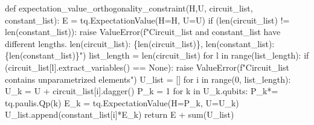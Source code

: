 \documentclass[
  letterpaper,
  DIV=11,
  numbers=noendperiod]{scrartcl}
\newenvironment{Shaded}{\begin{snugshade}}{\end{snugshade}}
\newcommand{\BuiltInTok}[1]{\textcolor[rgb]{0.00,0.23,0.31}{#1}}
\newcommand{\ControlFlowTok}[1]{\textcolor[rgb]{0.00,0.23,0.31}{#1}}
\newcommand{\DecValTok}[1]{\textcolor[rgb]{0.68,0.00,0.00}{#1}}
\newcommand{\KeywordTok}[1]{\textcolor[rgb]{0.00,0.23,0.31}{#1}}
\newcommand{\NormalTok}[1]{\textcolor[rgb]{0.00,0.23,0.31}{#1}}
\newcommand{\OperatorTok}[1]{\textcolor[rgb]{0.37,0.37,0.37}{#1}}
\newcommand{\PreprocessorTok}[1]{\textcolor[rgb]{0.68,0.00,0.00}{#1}}
\newcommand{\SpecialCharTok}[1]{\textcolor[rgb]{0.37,0.37,0.37}{#1}}
\newcommand{\SpecialStringTok}[1]{\textcolor[rgb]{0.13,0.47,0.30}{#1}}
\newcommand{\VariableTok}[1]{\textcolor[rgb]{0.07,0.07,0.07}{#1}}
\begin{document}
\begin{Shaded}
\begin{Highlighting}[]
    \KeywordTok{def}\NormalTok{ expectation\_value\_orthogonality\_constraint(H,U, circuit\_list, constant\_list):}
\NormalTok{        E }\OperatorTok{=}\NormalTok{ tq.ExpectationValue(H}\OperatorTok{=}\NormalTok{H, U}\OperatorTok{=}\NormalTok{U)}
        \ControlFlowTok{if}\NormalTok{ (}\BuiltInTok{len}\NormalTok{(circuit\_list) }\OperatorTok{!=} \BuiltInTok{len}\NormalTok{(constant\_list)):}
            \ControlFlowTok{raise} \PreprocessorTok{ValueError}\NormalTok{(}\SpecialStringTok{f"Circuit\_list and constant\_list have different lengths. len(circuit\_list): \textquotesingle{}}\SpecialCharTok{\{}\BuiltInTok{len}\NormalTok{(circuit\_list)}\SpecialCharTok{\}}\SpecialStringTok{\textquotesingle{}, len(constant\_list): \textquotesingle{}}\SpecialCharTok{\{}\BuiltInTok{len}\NormalTok{(constant\_list)}\SpecialCharTok{\}}\SpecialStringTok{\textquotesingle{}"}\NormalTok{)}
\NormalTok{        list\_length }\OperatorTok{=} \BuiltInTok{len}\NormalTok{(circuit\_list)}
        \ControlFlowTok{for}\NormalTok{ l }\KeywordTok{in} \BuiltInTok{range}\NormalTok{(list\_length):}
            \ControlFlowTok{if}\NormalTok{ (circuit\_list[l].extract\_variables() }\OperatorTok{==} \VariableTok{None}\NormalTok{):}
                \ControlFlowTok{raise} \PreprocessorTok{ValueError}\NormalTok{(}\SpecialStringTok{f"Circuit\_list contains unparametrized elements"}\NormalTok{)}
\NormalTok{        U\_list }\OperatorTok{=}\NormalTok{ []}
        \ControlFlowTok{for}\NormalTok{ i }\KeywordTok{in} \BuiltInTok{range}\NormalTok{(}\DecValTok{0}\NormalTok{, list\_length):}
\NormalTok{            U\_k }\OperatorTok{=}\NormalTok{ U }\OperatorTok{+}\NormalTok{ circuit\_list[i].dagger()}
\NormalTok{            P\_k }\OperatorTok{=} \DecValTok{1}
            \ControlFlowTok{for}\NormalTok{ k }\KeywordTok{in}\NormalTok{ U\_k.qubits:}
\NormalTok{                P\_k}\OperatorTok{*=}\NormalTok{ tq.paulis.Qp(k)}
\NormalTok{            E\_k }\OperatorTok{=}\NormalTok{ tq.ExpectationValue(H}\OperatorTok{=}\NormalTok{P\_k, U}\OperatorTok{=}\NormalTok{U\_k)}
\NormalTok{            U\_list.append(constant\_list[i]}\OperatorTok{*}\NormalTok{E\_k)}
        \ControlFlowTok{return}\NormalTok{ E }\OperatorTok{+} \BuiltInTok{sum}\NormalTok{(U\_list)}


\end{Highlighting}
\end{Shaded}
\end{document}
